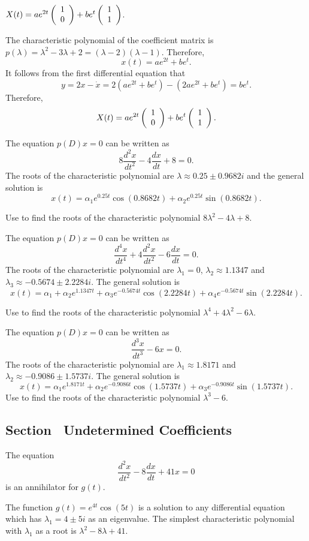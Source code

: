  \ans $X(t) = ae^{2t}\left(\begin{array}{r} 1 \\ 0\end{array}\right) + be^t\left(\begin{array}{r} 1 \\ 1\end{array}\right)$.

\soln  The characteristic polynomial of the coefficient matrix is 
$p(\lambda) = \lambda^2-3\lambda+2=(\lambda-2)(\lambda-1)$.  Therefore, 
\[
x(t) = ae^{2t}+be^t.
\]
It follows from the first differential equation that 
\[
y = 2x-\dot{x} = 2(ae^{2t}+be^t)-(2ae^{2t}+be^t) = be^t.
\]
Therefore,
\[
X(t) = ae^{2t}\left(\begin{array}{r} 1 \\ 0\end{array}\right) + be^t\left(\begin{array}{r} 1 \\ 1\end{array}\right).
\]


 \ans The equation $p(D)x = 0$ can be written as
\[
8\frac{d^2x}{dt^2} - 4\frac{dx}{dt} + 8 = 0.
\]  
The roots of the characteristic polynomial are $\lambda \approx 0.25
\pm 0.9682i$ and the general solution is
\[
x(t) = \alpha_1e^{0.25t}\cos(0.8682t) +
\alpha_2e^{0.25t}\sin(0.8682t).
\]

\soln Use \Matlab to find the roots of the characteristic polynomial
$8\lambda^2 - 4\lambda + 8$.

 \ans The equation $p(D)x = 0$ can be written as
\[
\frac{d^4x}{dt^4} + 4\frac{d^2x}{dt^2} - 6\frac{dx}{dt} = 0.
\]
The roots of the characteristic polynomial are $\lambda_1 = 0$,
$\lambda_2 \approx 1.1347$ and $\lambda_3 \approx -0.5674 \pm 2.2284i$.
The general solution is
\[
x(t) = \alpha_1 + \alpha_2e^{1.1347t} + \alpha_3e^{-0.5674t}\cos(2.2284t) +
\alpha_4e^{-0.5674t}\sin(2.2284t).
\]

\soln Use \Matlab to find the roots of the characteristic polynomial
$\lambda^4 + 4\lambda^2 - 6\lambda$.

 \ans The equation $p(D)x = 0$ can be written as
\[
\frac{d^3x}{dt^3} - 6x = 0.
\]
The roots of the characteristic polynomial are $\lambda_1 \approx
1.8171$ and $\lambda_2 \approx -0.9086 \pm 1.5737i$.  The general
solution is
\[
x(t) = \alpha_1e^{1.8171t} + \alpha_2e^{-0.9086t}\cos(1.5737t) +
\alpha_3e^{-0.9086t}\sin(1.5737t).
\]
\soln Use \Matlab to find the roots of the characteristic polynomial
$\lambda^3 - 6$.



\subsection*{Section~\protect{\ref{sec:2norderinhom}} Undetermined Coefficients}

 \ans The equation
\[
\frac{d^2x}{dt^2} - 8\frac{dx}{dt} + 41x = 0
\]
is an annihilator for $g(t)$.

\soln The function $g(t) = e^{4t}\cos(5t)$ is a solution to any differential
equation which has $\lambda_1 = 4 \pm 5i$ as an eigenvalue.  The
simplest characteristic polynomial with $\lambda_1$ as a root is
$\lambda^2 - 8\lambda + 41$.

